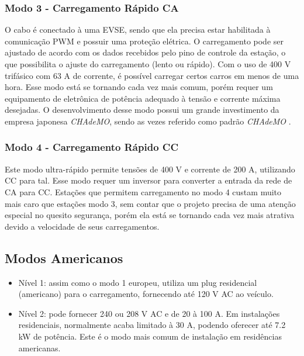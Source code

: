         \subsubsection{Modo 3 - Carregamento Rápido CA}
        \label{stateofart:modes:europe:mode3}

        O cabo é conectado à uma \ac{EVSE}, sendo que ela precisa estar habilitada à comunicação PWM e possuir uma proteção elétrica. O carregamento pode ser ajustado de acordo com os dados recebidos pelo pino de controle da estação, o que possibilita o ajuste do carregamento (lento ou rápido). Com o uso de 400 V trifásico com 63 A de corrente, é possível carregar certos carros em menos de uma hora. Esse modo está se tornando cada vez mais comum, porém requer um equipamento de eletrônica de potência adequado à tensão e corrente máxima desejadas. O desenvolvimento desse modo possui um grande investimento da empresa japonesa \textit{CHAdeMO}, sendo as vezes referido como padrão \textit{CHAdeMO} \cite{ieee-review-evse}.

        \subsubsection{Modo 4 - Carregamento Rápido CC}
        \label{stateofart:modes:europe:mode4}

        Este modo ultra-rápido permite tensões de 400 V e corrente de 200 A, utilizando \ac{CC} para tal. Esse modo requer um inversor para converter a entrada da rede de \ac{CA} para \ac{CC}. Estações que permitem carregamento no modo 4 custam muito mais caro que estações modo 3, sem contar que o projeto precisa de uma atenção especial no quesito segurança, porém ela está se tornando cada vez mais atrativa devido a velocidade de seus carregamentos.

    \subsection{Modos Americanos}
    \label{stateofart:modes:us}

      \begin{itemize}
        \item Nível 1: assim como o modo 1 europeu, utiliza um plug residencial (americano) para o carregamento, fornecendo até 120 V AC ao veículo.
        \item Nível 2: pode fornecer 240 ou 208 V AC e de 20 à 100 A. Em instalações residenciais, normalmente acaba limitado à 30 A, podendo oferecer até 7.2 kW de potência. Este é o modo mais comum de instalação em residências americanas.
      \end{itemize}

